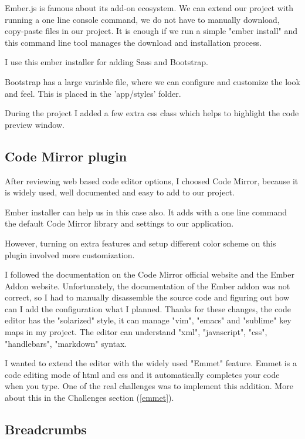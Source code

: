 \documentclass[12pt, a4paper, oneside, openright, medskipamount]{report}
\begin{document}
Ember.js is famous about its add-on ecosystem. We can extend our project with running a one line console command, we do not have to manually download, copy-paste files in our project. It is enough if we run a simple "ember install" and this command line tool manages the download and installation process.

I use this ember installer for adding Sass and Bootstrap.

Bootstrap has a large variable file, where we can configure and customize the look and feel. This is placed in the 'app/styles' folder.

During the project I added a few extra css class which helps to highlight the code preview window.

\subsection{Code Mirror plugin}

After reviewing web based code editor options, I choosed Code Mirror, because it is widely used, well documented and easy to add to our project.

Ember installer can help us in this case also. It adds with a one line command the default Code Mirror library and settings to our application.

However, turning on extra features and setup different color scheme on this plugin involved more customization.

I followed the documentation on the Code Mirror official website and the Ember Addon website. Unfortunately, the documentation of the Ember addon was not correct, so I had to manually disassemble the source code and figuring out how can I add the configuration what I planned. Thanks for these changes, the code editor has the "solarized" style, it can manage "vim", "emacs" and "sublime" key maps in my project. The editor can understand "xml", "javascript", "css", "handlebars", "markdown" syntax.

I wanted to extend the editor with the widely used "Emmet" feature. Emmet is a code editing mode of html and css and it automatically completes your code when you type. One of the real challenges was to implement this addition. More about this in the Challenges section (\ref{emmet}).

\subsection{Breadcrumbs}
\end{document}
